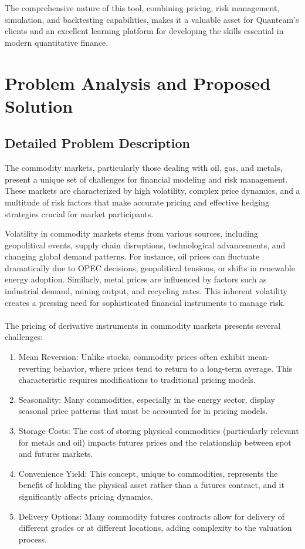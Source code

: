 \documentclass[12pt]{article}
\begin{document}
The comprehensive nature of this tool, combining pricing, risk management, simulation, and backtesting capabilities, makes it a valuable asset for Quanteam's clients and an excellent learning platform for developing the skills essential in modern quantitative finance.

\section{Problem Analysis and Proposed Solution}

\subsection{Detailed Problem Description}

The commodity markets, particularly those dealing with oil, gas, and metals, present a unique set of challenges for financial modeling and risk management. These markets are characterized by high volatility, complex price dynamics, and a multitude of risk factors that make accurate pricing and effective hedging strategies crucial for market participants.\\\par
Volatility in commodity markets stems from various sources, including geopolitical events, supply chain disruptions, technological advancements, and changing global demand patterns. For instance, oil prices can fluctuate dramatically due to OPEC decisions, geopolitical tensions, or shifts in renewable energy adoption. Similarly, metal prices are influenced by factors such as industrial demand, mining output, and recycling rates. This inherent volatility creates a pressing need for sophisticated financial instruments to manage risk.\\\\
The pricing of derivative instruments in commodity markets presents several challenges:
\begin{enumerate}

\item Mean Reversion: Unlike stocks, commodity prices often exhibit mean-reverting behavior, where prices tend to return to a long-term average. This characteristic requires modifications to traditional pricing models.
\item Seasonality: Many commodities, especially in the energy sector, display seasonal price patterns that must be accounted for in pricing models.
\item Storage Costs: The cost of storing physical commodities (particularly relevant for metals and oil) impacts futures prices and the relationship between spot and futures markets.
\item Convenience Yield: This concept, unique to commodities, represents the benefit of holding the physical asset rather than a futures contract, and it significantly affects pricing dynamics.
\item Delivery Options: Many commodity futures contracts allow for delivery of different grades or at different locations, adding complexity to the valuation process.
\end{enumerate}
\end{document}
